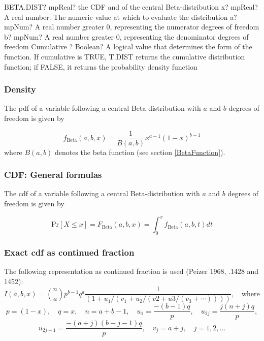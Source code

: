 \vspace{0.6cm}
\begin{mpFunctionsExtract}
	\mpWorksheetFunctionFourNotImplemented
	{BETA.DIST? mpReal? the CDF and of the central Beta-distribution}
	{x? mpReal? A real number. The numeric value at which to evaluate the distribution}
	{a? mpNum? A real number greater 0, representing the numerator  degrees of freedom}
	{b? mpNum? A real number greater 0, representing the denominator degrees of freedom}
	{Cumulative ? Boolean? A logical value that determines the form of the function. If cumulative is TRUE, T.DIST returns the cumulative distribution function; if FALSE, it returns the probability density function}
\end{mpFunctionsExtract}


\subsubsection{Density}
\label{BetaDistributionDensity}
The pdf of a variable following a central  Beta-distribution with $a$ and $b$ degrees of freedom is given by

\begin{equation}
	f_{\text{Beta}}(a,b,x) = \frac{1}{B(a,b)} x^{a-1}(1-x)^{b-1}
\end{equation}
where $B(a,b)$ denotes the beta function (see section \ref{BetaFunction}).

\subsubsection{CDF: General formulas}
\label{BetaDistributionCDF}
The cdf of a variable following a central  Beta-distribution with $a$ and $b$ degrees of freedom is given by

\begin{equation}
	\text{Pr}\left[X \le x\right] = F_{\text{Beta}}\left(a,b,x\right) =  \int_{0}^{x} f_{\text{Beta}}(a,b,t) dt
\end{equation}

\subsubsection{Exact cdf as continued fraction}
The following representation as continued fraction is used (Peizer 1968, .1428 and 1452):
\begin{equation}
	I(a,b,x)= \binom{n}{a} p^{b-1} q^a \frac{1}{(1+u_1/(v_1+u_2/(v2+u3/(v_3+ \cdots))))}, \quad \text{where } 
\end{equation}
\begin{equation*}
	p=(1-x), \quad q=x, \quad n=a+b-1, \quad u_1= \frac{-(b-1)q}{p}, \quad u_{2j}= \frac{j(n+j)q}{p},
\end{equation*}
\begin{equation*}
	u_{2j+1}= \frac{-(a+j)(b-j-1)q}{p}, \quad v_j=a+j, \quad j=1,2,\ldots
\end{equation*}


